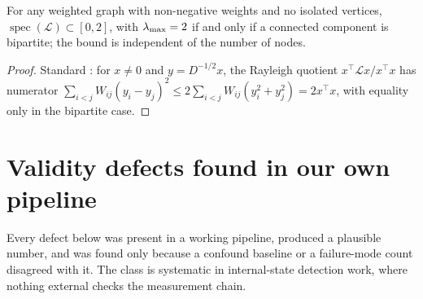 \begin{lemma}
\label{lem:bounded}
For any weighted graph with non-negative weights and no isolated vertices,
$\operatorname{spec}(\mathcal{L})\subset[0,2]$, with $\lambda_{\max}=2$ if and only if a connected component is
bipartite; the bound is independent of the number of nodes.
\end{lemma}
\begin{proof}
Standard \citep{chung1997spectral}: for $x\ne 0$ and $y=D^{-1/2}x$, the Rayleigh quotient
$x^\top\mathcal{L}x/x^\top x$ has numerator $\sum_{i<j}W_{ij}(y_i-y_j)^2\le 2\sum_{i<j}W_{ij}(y_i^2+y_j^2)=2x^\top x$,
with equality only in the bipartite case.
\end{proof}

\section{Validity defects found in our own pipeline}
\label{app:validity}

Every defect below was present in a working pipeline, produced a plausible number, and was found only because
a confound baseline or a failure-mode count disagreed with it. The class is systematic in internal-state
detection work, where nothing external checks the measurement chain.

